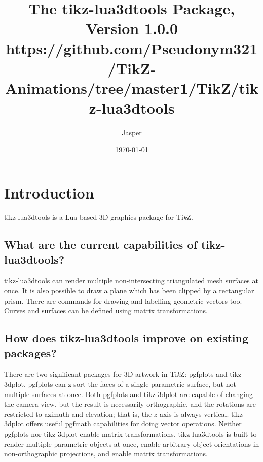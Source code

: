 \documentclass[12pt]{report}
\title{
    The tikz-lua3dtools Package,\\
    Version 1.0.0\\
    {\small https://github.com/Pseudonym321/TikZ-Animations/tree/master1/TikZ/tikz-lua3dtools}
}
\author{Jasper}
\date{\today}
\begin{document}
    \maketitle 
    \tableofcontents
    \chapter{Introduction}
        tikz-lua3dtools is a Lua-based 3D graphics package for 
        Ti\textit{k}Z.
        \section{What are the current capabilities of tikz-lua3dtools?}
            tikz-lua3dtools can render multiple non-intersecting 
            triangulated mesh surfaces at once. It is also possible 
            to draw a plane which has been clipped by a rectangular
            prism.
            There are commands for drawing and labelling geometric 
            vectors too. Curves and surfaces can be defined using 
            matrix transformations.
        \section{
            How does tikz-lua3dtools improve on existing packages?
        }
            There are two significant packages for 3D artwork in 
            Ti\textit{k}Z: pgfplots and tikz-3dplot.
            pgfplots can z-sort the faces of a single parametric 
            surface, but not multiple surfaces at once.
            Both pgfplots and tikz-3dplot are capable of changing 
            the camera view, but the result is necessarily 
            orthographic, and the rotations are restricted to 
            azimuth and elevation; that is, the \(z\)-axis is always 
            vertical. tikz-3dplot offers useful pgfmath capabilities 
            for doing vector operations.
            Neither pgfplots nor tikz-3dplot enable 
            matrix transformations. tikz-lua3dtools is built to render 
            multiple parametric objects at once, enable arbitrary
            object orientations in non-orthographic projections, 
            and enable matrix transformations.
\end{document}
